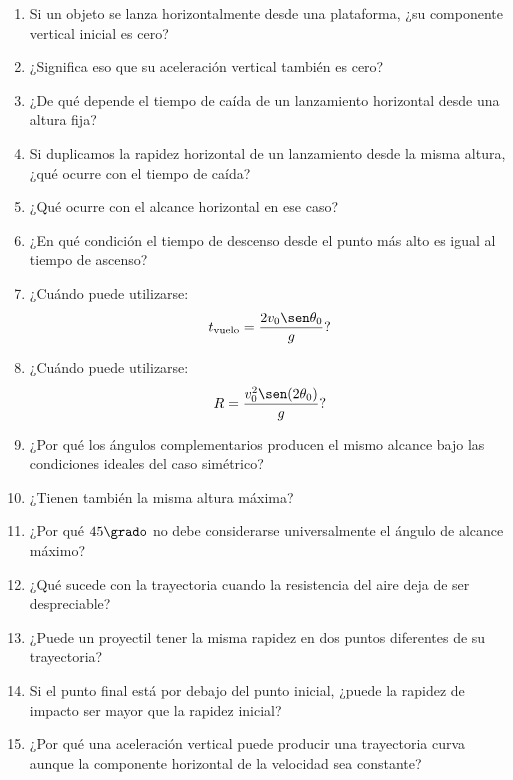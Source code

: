 \begin{enumerate}
    \item Si un objeto se lanza horizontalmente desde una plataforma, ¿su componente
    vertical inicial es cero?

    \item ¿Significa eso que su aceleración vertical también es cero?

    \item ¿De qué depende el tiempo de caída de un lanzamiento horizontal desde una
    altura fija?

    \item Si duplicamos la rapidez horizontal de un lanzamiento desde la misma
    altura, ¿qué ocurre con el tiempo de caída?

    \item ¿Qué ocurre con el alcance horizontal en ese caso?

    \item ¿En qué condición el tiempo de descenso desde el punto más alto es igual
    al tiempo de ascenso?

    \item ¿Cuándo puede utilizarse:
    \[
    t_{\mathrm{vuelo}}
    =
    \frac{2v_0\sen\theta_0}{g}?
    \]

    \item ¿Cuándo puede utilizarse:
    \[
    R
    =
    \frac{v_0^2\sen(2\theta_0)}{g}?
    \]

    \item ¿Por qué los ángulos complementarios producen el mismo alcance bajo las
    condiciones ideales del caso simétrico?

    \item ¿Tienen también la misma altura máxima?

    \item ¿Por qué \(45\grado\) no debe considerarse universalmente el ángulo de
    alcance máximo?

    \item ¿Qué sucede con la trayectoria cuando la resistencia del aire deja de ser
    despreciable?

    \item ¿Puede un proyectil tener la misma rapidez en dos puntos diferentes de su
    trayectoria?

    \item Si el punto final está por debajo del punto inicial, ¿puede la rapidez de
    impacto ser mayor que la rapidez inicial?

    \item ¿Por qué una aceleración vertical puede producir una trayectoria curva
    aunque la componente horizontal de la velocidad sea constante?
\end{enumerate}



